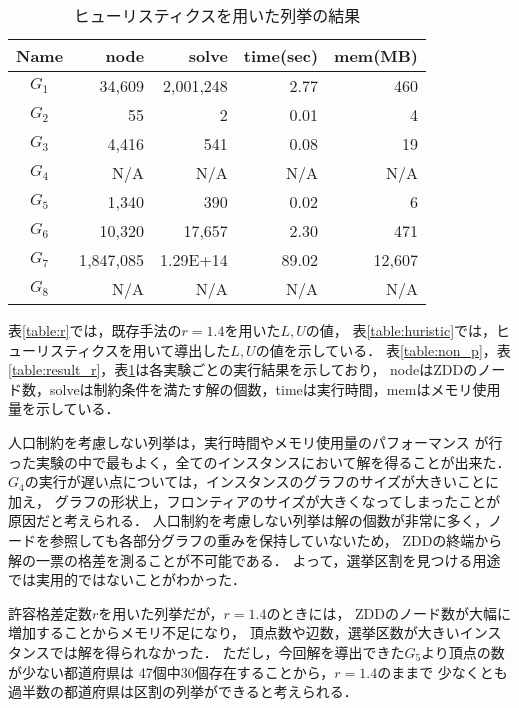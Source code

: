 \documentclass[10pt,a4paper,notitlepage,oneside,twocolumn]{abst_jsarticle}
\begin{document}
\begin{table}[htbp]
  \small
  \caption{ヒューリスティクスを用いた列挙の結果}
  \label{table:answer_h}
  \centering
  \begin{tabular}{c|rrrr}
    \hline
    Name &  node & solve & time(sec) & mem(MB) \\
    \hline \hline
    $G_1$ & 34{,}609 & 2{,}001{,}248 & 2.77 & 460 \\
    $G_2$ & 55 & 2 & 0.01 & 4 \\
    $G_3$ & 4{,}416 & 541 & 0.08 & 19 \\
    $G_4$ & N/A & N/A & N/A & N/A \\
    $G_5$ & 1{,}340 & 390 & 0.02 & 6 \\
    $G_6$ & 10{,}320 & 17{,}657 & 2.30 & 471 \\
    $G_7$ & 1{,}847{,}085 & 1.29E+14 & 89.02 & 12{,}607 \\
    $G_8$ & N/A & N/A & N/A & N/A \\
    \hline
  \end{tabular}
\end{table}

表\ref{table:r}では，既存手法の$r=1.4$を用いた$L, U$の値，
表\ref{table:huristic}では，ヒューリスティクスを用いて導出した$L, U$の値を示している．
表\ref{table:non_p}，表\ref{table:result_r}，表\ref{table:answer_h}は各実験ごとの実行結果を示しており，
nodeはZDDのノード数，solveは制約条件を満たす解の個数，timeは実行時間，memはメモリ使用量を示している．

人口制約を考慮しない列挙は，実行時間やメモリ使用量のパフォーマンス
が行った実験の中で最もよく，全てのインスタンスにおいて解を得ることが出来た．
$G_4$の実行が遅い点については，インスタンスのグラフのサイズが大きいことに加え，
グラフの形状上，フロンティアのサイズが大きくなってしまったことが原因だと考えられる．
人口制約を考慮しない列挙は解の個数が非常に多く，ノードを参照しても各部分グラフの重みを保持していないため，
ZDDの終端から解の一票の格差を測ることが不可能である．
よって，選挙区割を見つける用途では実用的ではないことがわかった．

許容格差定数$r$を用いた列挙だが，$r=1.4$のときには，
ZDDのノード数が大幅に増加することからメモリ不足になり，
頂点数や辺数，選挙区数が大きいインスタンスでは解を得られなかった．
ただし，今回解を導出できた$G_5$より頂点の数が少ない都道府県は
47個中30個存在することから，$r=1.4$のままで
少なくとも過半数の都道府県は区割の列挙ができると考えられる．
\end{document}

